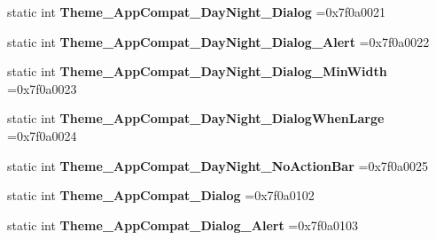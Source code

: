 \begin{DoxyCompactItemize}
\item 
\mbox{\label{classandroid_1_1support_1_1v7_1_1recyclerview_1_1R_1_1style_ac25e9364c330af0ad1ef946a6c8dbdc2}} 
static int {\bfseries Theme\+\_\+\+App\+Compat\+\_\+\+Day\+Night\+\_\+\+Dialog} =0x7f0a0021
\item 
\mbox{\label{classandroid_1_1support_1_1v7_1_1recyclerview_1_1R_1_1style_a89539fd0b898c42d10a16664b59857c7}} 
static int {\bfseries Theme\+\_\+\+App\+Compat\+\_\+\+Day\+Night\+\_\+\+Dialog\+\_\+\+Alert} =0x7f0a0022
\item 
\mbox{\label{classandroid_1_1support_1_1v7_1_1recyclerview_1_1R_1_1style_a591d2aae1a24b859c823c841a0def9bd}} 
static int {\bfseries Theme\+\_\+\+App\+Compat\+\_\+\+Day\+Night\+\_\+\+Dialog\+\_\+\+Min\+Width} =0x7f0a0023
\item 
\mbox{\label{classandroid_1_1support_1_1v7_1_1recyclerview_1_1R_1_1style_a18eb54fba1be4db9ca8c872584a49fb5}} 
static int {\bfseries Theme\+\_\+\+App\+Compat\+\_\+\+Day\+Night\+\_\+\+Dialog\+When\+Large} =0x7f0a0024
\item 
\mbox{\label{classandroid_1_1support_1_1v7_1_1recyclerview_1_1R_1_1style_afccaefe3926a1a4ddde890b671d4c0ab}} 
static int {\bfseries Theme\+\_\+\+App\+Compat\+\_\+\+Day\+Night\+\_\+\+No\+Action\+Bar} =0x7f0a0025
\item 
\mbox{\label{classandroid_1_1support_1_1v7_1_1recyclerview_1_1R_1_1style_a7173de9c9da914cfb4b13b0950343378}} 
static int {\bfseries Theme\+\_\+\+App\+Compat\+\_\+\+Dialog} =0x7f0a0102
\item 
\mbox{\label{classandroid_1_1support_1_1v7_1_1recyclerview_1_1R_1_1style_a81f5372210df21b45099c0a3c6a20f14}} 
static int {\bfseries Theme\+\_\+\+App\+Compat\+\_\+\+Dialog\+\_\+\+Alert} =0x7f0a0103
\item 
\mbox{\label{classandroid_1_1support_1_1v7_1_1recyclerview_1_1R_1_1style_ace254f156034da9570643bc025611ecc}} 

\end{DoxyCompactItemize}
